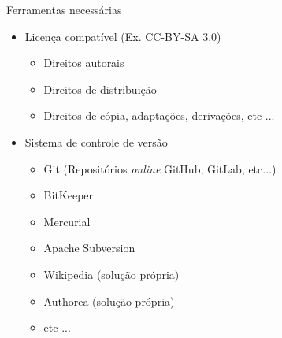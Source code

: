 \documentclass{beamer}
\begin{document}
\begin{frame}{Ferramentas necessárias}
  \begin{itemize}
  \item Licença compatível (Ex. CC-BY-SA 3.0)
    \begin{itemize}
    \item Direitos autorais
    \item Direitos de distribuição
    \item Direitos de cópia, adaptações, derivações, etc ...
    \end{itemize}
  \item Sistema de controle de versão
    \begin{itemize}
    \item Git (Repositórios {\it online} GitHub, GitLab, etc...)
    \item BitKeeper
    \item Mercurial
    \item Apache Subversion
    \item Wikipedia (solução própria)
    \item Authorea (solução própria)
    \item etc ...
    \end{itemize}
  \end{itemize}
\end{frame}
\end{document}
